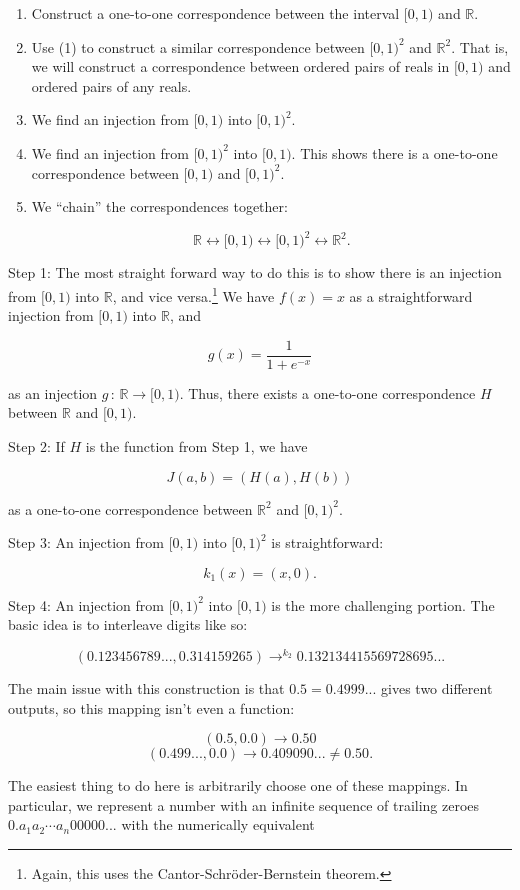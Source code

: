 \documentclass[../gatm_answers.tex]{subfiles}
\begin{document}
\begin{enumerate}
\item Construct a one-to-one correspondence between the interval $[0,1)$ and $\mathbb{R}$.
\item Use (1) to construct a similar correspondence between $[0,1)^2$ and $\mathbb{R}^2$. That is, we will construct a correspondence between ordered pairs of reals in $[0,1)$ and ordered pairs of any reals.
\item We find an injection from $[0,1)$ into $[0,1)^2$. 
\item We find an injection from $[0,1)^2$ into $[0,1)$. This shows there is a one-to-one correspondence between $[0,1)$ and $[0,1)^2$.
\item We ``chain'' the correspondences together:

$$\mathbb{R} \leftrightarrow [0,1) \leftrightarrow [0,1)^2 \leftrightarrow \mathbb{R}^2.$$
\end{enumerate}

Step 1: The most straight forward way to do this is to show there is an injection from $[0,1)$ into $\mathbb{R}$, and vice versa.\footnote{Again, this uses the Cantor-Schröder-Bernstein theorem.} We have $f(x)=x$ as a straightforward injection from $[0,1)$ into $\mathbb{R}$, and

$$g(x)=\frac{1}{1+e^{-x}}$$

as an injection $g\, : \, \mathbb{R} \to [0,1)$. Thus, there exists a one-to-one correspondence $H$ between $\mathbb{R}$ and $[0,1)$.

Step 2: If $H$ is the function from Step 1, we have

$$J(a,b)=(H(a),H(b))$$

as a one-to-one correspondence between $\mathbb{R}^2$ and $[0,1)^2$.

Step 3: An injection from $[0,1)$ into $[0,1)^2$ is straightforward:

$$k_1(x)=(x, 0).$$

Step 4: An injection from $[0,1)^2$ into $[0,1)$ is the more challenging portion. The basic idea is to interleave digits like so:

$$(0.123456789..., 0.314159265)\mathop{\to} ^ {k_2} 0.132134415569728695...$$

The main issue with this construction is that $0.5=0.4999...$ gives two different outputs, so this mapping isn't even a function:

$$(0.5,0.0)\to 0.50$$
$$(0.499...,0.0)\to 0.409090... \neq 0.50.$$

The easiest thing to do here is arbitrarily choose one of these mappings. In particular, we represent a number with an infinite sequence of trailing zeroes $0.a_1a_2\cdots a_n00000...$ with the numerically equivalent
\end{document}

